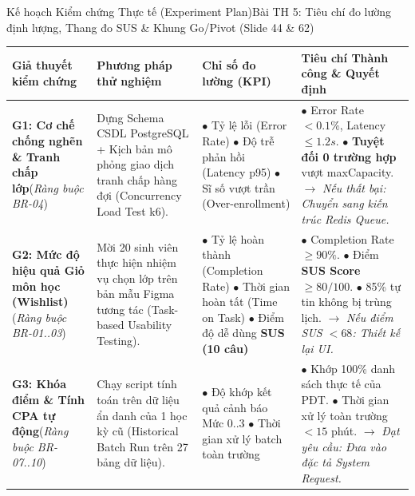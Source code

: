 \documentclass[aspectratio=169, 10pt]{beamer}
\begin{document}
\begin{frame}[t]{Kế hoạch Kiểm chứng Thực tế (Experiment Plan)}{Bài TH 5: Tiêu chí đo lường định lượng, Thang đo SUS \& Khung Go/Pivot (Slide 44 \& 62)}
  \vspace{-0.15cm}
  \tiny
  \begin{tabularx}{\linewidth}{@{}P{2.6cm}YP{3.0cm}Y@{}}
    \toprule
    \textbf{Giả thuyết kiểm chứng} & \textbf{Phương pháp thử nghiệm} & \textbf{Chỉ số đo lường (KPI)} & \textbf{Tiêu chí Thành công \& Quyết định} \\
    \midrule
    \textbf{G1: Cơ chế chống nghẽn \& Tranh chấp lớp}\newline(\textit{Ràng buộc BR-04}) & 
    Dựng Schema CSDL PostgreSQL + Kịch bản mô phỏng giao dịch tranh chấp hàng đợi (Concurrency Load Test k6). & 
    $\bullet$ Tỷ lệ lỗi (Error Rate)\newline
    $\bullet$ Độ trễ phản hồi (Latency p95)\newline
    $\bullet$ Sĩ số vượt trần (Over-enrollment) & 
    $\bullet$ Error Rate $< 0.1\%$, Latency $\le 1.2s$.\newline
    $\bullet$ \textbf{Tuyệt đối 0 trường hợp} vượt maxCapacity.\newline
    $\to$ \textit{Nếu thất bại: Chuyển sang kiến trúc Redis Queue.} \\
    \midrule
    \textbf{G2: Mức độ hiệu quả Giỏ môn học (Wishlist)}\newline(\textit{Ràng buộc BR-01..03}) & 
    Mời 20 sinh viên thực hiện nhiệm vụ chọn lớp trên bản mẫu Figma tương tác (Task-based Usability Testing). & 
    $\bullet$ Tỷ lệ hoàn thành (Completion Rate)\newline
    $\bullet$ Thời gian hoàn tất (Time on Task)\newline
    $\bullet$ Điểm độ dễ dùng \textbf{SUS (10 câu)} & 
    $\bullet$ Completion Rate $\ge 90\%$.\newline
    $\bullet$ Điểm \textbf{SUS Score $\ge 80/100$}.\newline
    $\bullet$ 85\% tự tin không bị trùng lịch.\newline
    $\to$ \textit{Nếu điểm SUS $< 68$: Thiết kế lại UI.} \\
    \midrule
    \textbf{G3: Khóa điểm \& Tính CPA tự động}\newline(\textit{Ràng buộc BR-07..10}) & 
    Chạy script tính toán trên dữ liệu ẩn danh của 1 học kỳ cũ (Historical Batch Run trên 27 bảng dữ liệu). & 
    $\bullet$ Độ khớp kết quả cảnh báo Mức 0..3\newline
    $\bullet$ Thời gian xử lý batch toàn trường & 
    $\bullet$ Khớp 100\% danh sách thực tế của PĐT.\newline
    $\bullet$ Thời gian xử lý toàn trường $< 15$ phút.\newline
    $\to$ \textit{Đạt yêu cầu: Đưa vào đặc tả System Request.} \\
    \bottomrule
  \end{tabularx}
\end{frame}
\end{document}
